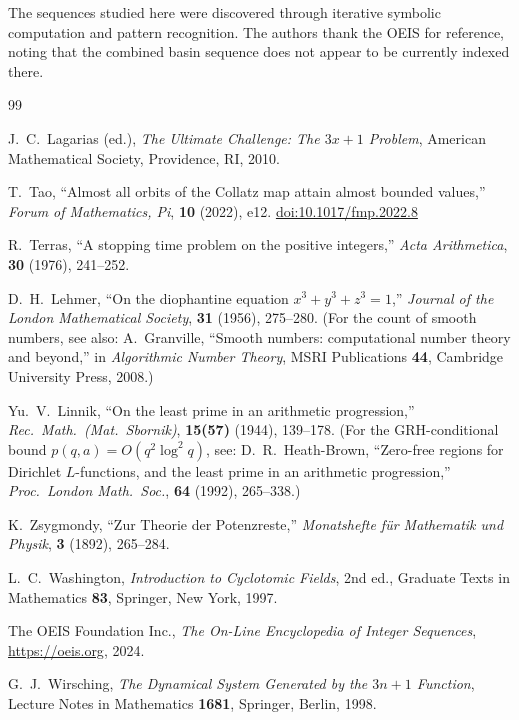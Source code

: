 \documentclass[12pt]{amsart}
\theoremstyle{definition}
\begin{document}
The sequences studied here were discovered through iterative symbolic
computation and pattern recognition.  The authors thank the OEIS
\cite{OEIS} for reference, noting that the combined basin sequence does not
appear to be currently indexed there.

\begin{thebibliography}{99}

J.~C.~Lagarias (ed.),
\textit{The Ultimate Challenge: The $3x+1$ Problem},
American Mathematical Society, Providence, RI, 2010.

T.~Tao,
``Almost all orbits of the Collatz map attain almost bounded values,''
\textit{Forum of Mathematics, Pi}, \textbf{10} (2022), e12.
\href{https://doi.org/10.1017/fmp.2022.8}{doi:10.1017/fmp.2022.8}

R.~Terras,
``A stopping time problem on the positive integers,''
\textit{Acta Arithmetica}, \textbf{30} (1976), 241--252.

D.~H.~Lehmer,
``On the diophantine equation $x^3 + y^3 + z^3 = 1$,''
\textit{Journal of the London Mathematical Society}, \textbf{31} (1956),
275--280.
(For the count of smooth numbers, see also:
A.~Granville, ``Smooth numbers: computational number theory and beyond,''
in \textit{Algorithmic Number Theory}, MSRI Publications \textbf{44},
Cambridge University Press, 2008.)

Yu.~V.~Linnik,
``On the least prime in an arithmetic progression,''
\textit{Rec.\ Math.\ (Mat.\ Sbornik)}, \textbf{15(57)} (1944), 139--178.
(For the GRH-conditional bound $p(q,a) = O(q^2 \log^2 q)$, see:
D.~R.~Heath-Brown, ``Zero-free regions for Dirichlet $L$-functions,
and the least prime in an arithmetic progression,''
\textit{Proc.\ London Math.\ Soc.}, \textbf{64} (1992), 265--338.)

K.~Zsygmondy,
``Zur Theorie der Potenzreste,''
\textit{Monatshefte f\"ur Mathematik und Physik}, \textbf{3} (1892), 265--284.

L.~C.~Washington,
\textit{Introduction to Cyclotomic Fields}, 2nd ed.,
Graduate Texts in Mathematics \textbf{83},
Springer, New York, 1997.


The OEIS Foundation Inc.,
\textit{The On-Line Encyclopedia of Integer Sequences},
\url{https://oeis.org}, 2024.

G.~J.~Wirsching,
\textit{The Dynamical System Generated by the $3n+1$ Function},
Lecture Notes in Mathematics \textbf{1681},
Springer, Berlin, 1998.

\end{thebibliography}
\end{document}
